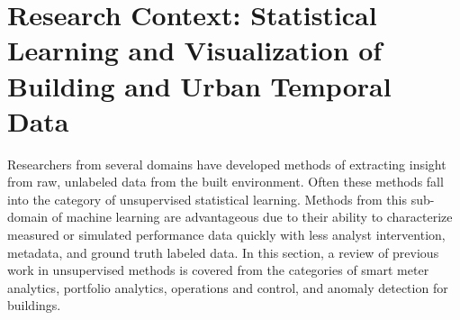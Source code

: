 \section{Research Context: Statistical Learning and Visualization of Building and Urban Temporal Data}
\label{sec:litreview}

Researchers from several domains have developed methods of extracting insight from raw, unlabeled data from the built environment. Often these methods fall into the category of unsupervised statistical learning. Methods from this sub-domain of machine learning are advantageous due to their ability to characterize measured or simulated performance data quickly with less analyst intervention, metadata, and ground truth labeled data. In this section, a review of previous work in unsupervised methods is covered from the categories of smart meter analytics, portfolio analytics, operations and control, and anomaly detection for buildings. 